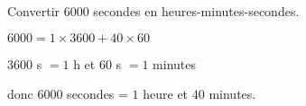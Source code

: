 \begin{exercice}
    Convertir $\num{6000}$ secondes en heures-minutes-secondes.
\end{exercice}
\begin{corrige}
    $\num{6000} = 1\times\num{3600} + 40\times 60$
    
    $\num{3600}$ s $=1$ h et $\num{60}$ s $=1$ minutes
    
    donc $\num{6000}$ secondes = $1$ heure et $40$ minutes.
\end{corrige}